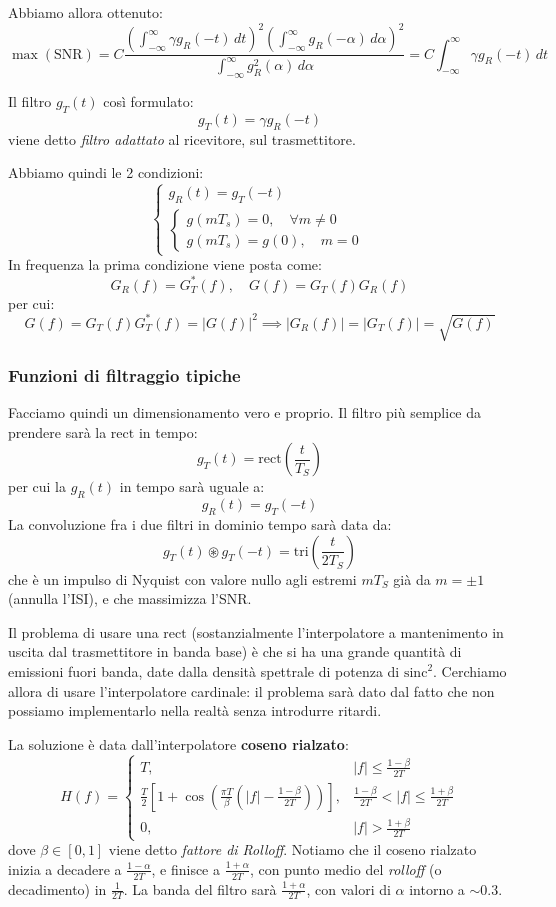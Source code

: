 \documentclass[a4paper,11pt]{article}
\begin{document}
Abbiamo allora ottenuto:
$$
\max \left( \mathrm{SNR} \right) = C \frac{ \left( \int_{-\infty}^{\infty} \gamma g_R(-t) \, dt \right)^2 \left( \int_{-\infty}^{\infty} g_R(-\alpha) \, d\alpha \right)^2 }{ \int_{-\infty}^{\infty} g_R^2 (\alpha) \, d\alpha } = C \int_{-\infty}^{\infty} \gamma g_R(-t) \, dt
$$

Il filtro $g_T(t)$ così formulato:
$$
g_T(t) = \gamma g_R(-t)
$$
viene detto \textit{filtro adattato} al ricevitore, sul trasmettitore.

Abbiamo quindi le 2 condizioni:
$$
\begin{cases}
g_R(t) = g_T(-t) \\
\begin{cases}
g(m T_s) = 0, \quad \forall m \neq 0 \\
g(m T_s) = g(0), \quad m = 0
\end{cases}
\end{cases}
$$
In frequenza la prima condizione viene posta come:
$$
G_R(f) = G_T^*(f), \quad G(f) = G_T(f) G_R(f)
$$
per cui:
$$
G(f) = G_T(f) G_T^*(f) = |G(f)|^2 \implies
|G_R(f)| = |G_T(f)| = \sqrt{G(f)}
$$

\subsubsection{Funzioni di filtraggio tipiche}

Facciamo quindi un dimensionamento vero e proprio. Il filtro più semplice da prendere sarà la $\mathrm{rect}$ in tempo: 
$$
g_T(t) = \mathrm{rect} \left( \frac{t}{T_S} \right)
$$
per cui la $g_R(t)$ in tempo sarà uguale a:
$$
g_R(t) = g_T(-t)
$$
La convoluzione fra i due filtri in dominio tempo sarà data da:
$$
g_T(t) \circledast g_T(-t) = \mathrm{tri} \left( \frac{t}{2 T_S} \right)
$$
che è un impulso di Nyquist con valore nullo agli estremi $m T_S$ già da $m = \pm 1$ (annulla l'ISI), e che massimizza l'SNR.

Il problema di usare una $\mathrm{rect}$ (sostanzialmente l'interpolatore a mantenimento in uscita dal trasmettitore in banda base) è che si ha una grande quantità di emissioni fuori banda, date dalla densità spettrale di potenza di $\mathrm{sinc}^2$. Cerchiamo allora di usare l'interpolatore cardinale: il problema sarà dato dal fatto che non possiamo implementarlo nella realtà senza introdurre ritardi.

La soluzione è data dall'interpolatore \textbf{coseno rialzato}:
$$
H(f)=
\begin{cases}
T, & |f|\le \frac{1-\beta}{2T} \\[6pt]
\frac{T}{2}\left[1+\cos\left(\frac{\pi T}{\beta}\left(|f|-\frac{1-\beta}{2T}\right)\right)\right], 
& \frac{1-\beta}{2T}<|f|\le \frac{1+\beta}{2T} \\[10pt]
0, & |f|>\frac{1+\beta}{2T}
\end{cases}
$$
dove $\beta \in [0, 1]$ viene detto \textit{fattore di Rolloff}. Notiamo che il coseno rialzato inizia a decadere a $\frac{1 - \alpha}{2T}$, e finisce a $\frac{1 + \alpha}{2 T}$, con punto medio del \textit{rolloff} (o decadimento) in $\frac{1}{2T}$. La banda del filtro sarà $\frac{1 + \alpha}{2T}$, con valori di $\alpha$ intorno a $\sim 0.3$.
\end{document}

